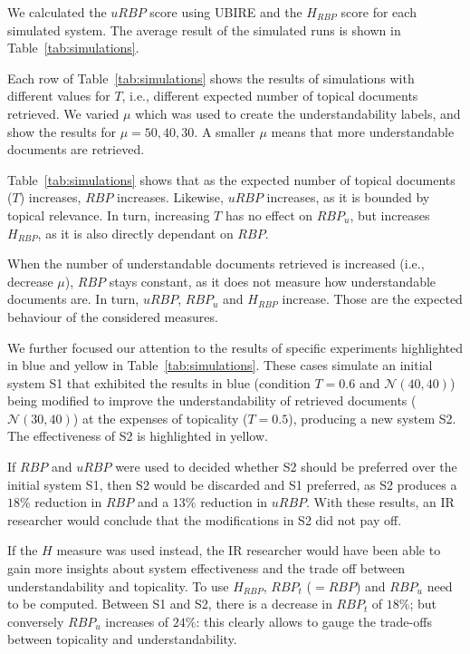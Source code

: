We calculated the $uRBP$ score using UBIRE and the $H_{RBP}$ score for each simulated system.
The average result of the simulated runs is shown in Table~\ref{tab:simulations}.

Each row of Table~\ref{tab:simulations} shows the results of simulations with different values for $T$, i.e., different expected number of topical documents retrieved.
We varied $\mu$ which was used to create the understandability labels, and show the results for $\mu = 50, 40, 30$.
A smaller $\mu$ means that more understandable documents are retrieved.

Table~\ref{tab:simulations} shows that as the expected number of topical documents ($T$) increases, $RBP$ increases.
Likewise, $uRBP$ increases, as it is bounded by topical relevance.
In turn, increasing $T$ has no effect on $RBP_u$, but increases $H_{RBP}$, as it is also directly dependant on $RBP$.

When the number of understandable documents retrieved is increased (i.e., decrease $\mu$), $RBP$ stays constant, as it does not measure how understandable documents are.
In turn, $uRBP$, $RBP_u$ and $H_{RBP}$ increase. 
Those are the expected behaviour of the considered measures. %

We further focused our attention to the results of specific experiments highlighted in blue and yellow in Table~\ref{tab:simulations}. These cases simulate an initial system S1 that exhibited the results in blue (condition $T=0.6$ and $\mathcal{N}(40,40)$) being modified to improve the understandability of retrieved documents ($\mathcal{N}(30,40)$) at the expenses of topicality ($T=0.5$), producing a new system S2. The effectiveness of S2 is highlighted in yellow. 

If $RBP$ and $uRBP$ were used to decided whether S2 should be preferred over the initial system S1, then S2 would be discarded and S1 preferred, as S2 produces a $18\%$ reduction in $RBP$ and a $13\%$ reduction in $uRBP$. With these results, an IR researcher would conclude that the modifications in S2 did not pay off.

If the $H$ measure was used instead, the IR researcher would have been able to gain more insights about system effectiveness and the trade off between understandability and topicality. To use $H_{RBP}$, $RBP_t$ ($=RBP$) and $RBP_u$ need to be computed. Between S1 and S2, there is a decrease in $RBP_t$ of $18\%$; but conversely $RBP_u$ increases of $24\%$: this clearly allows to gauge the trade-offs between topicality and understandability. 

